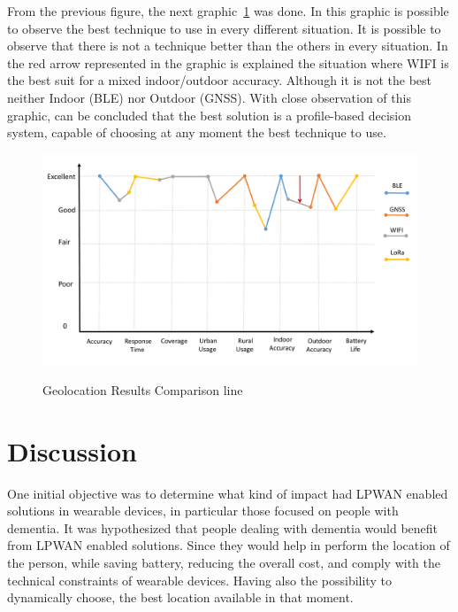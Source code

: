 From the previous figure, the next graphic~\ref{fig:radarline} was done. In this graphic is possible to observe the best technique to use in every different situation. It is possible to observe that there is not a technique better than the others in every situation. In the red arrow represented in the graphic is explained the situation where WIFI is the best suit for a mixed indoor/outdoor accuracy. Although it is not the best neither Indoor (BLE) nor Outdoor (GNSS). With   close observation of this graphic, can be concluded that the best solution is a profile-based decision system, capable of choosing at any moment the best technique to use.

\begin{figure}[htbp]
  \centering
  
    {\includegraphics[width=0.9\linewidth]{Chapters/Figures/radarline.pdf}}%
 
  \caption{Geolocation Results Comparison line}
  \label{fig:radarline}
\end{figure}




\section{Discussion}
\label{sec:Discussion}

One initial objective was to  determine what kind of impact had LPWAN enabled solutions in wearable devices, in particular those focused on people with dementia.\newline 
It was hypothesized that people dealing with dementia would benefit from LPWAN enabled solutions. Since they would help in perform the location of the person, while saving battery, reducing the overall cost, and comply with the technical constraints of wearable devices. Having also the possibility to dynamically choose, the best location available in that moment. 


